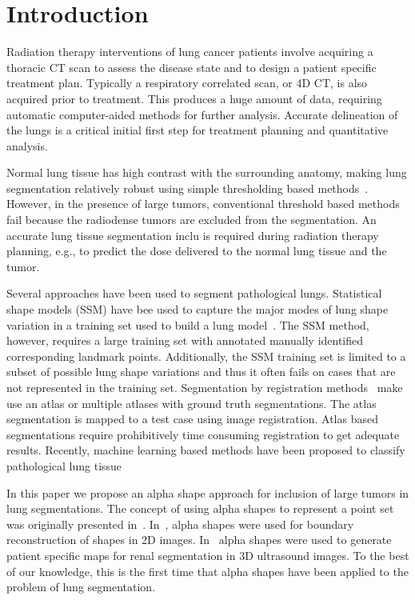 \documentclass{llncs}
\begin{document}
\section{Introduction}
%
Radiation therapy interventions of lung cancer patients involve acquiring a thoracic CT scan to assess the disease state and to design a patient specific treatment plan. Typically a respiratory correlated scan, or 4D CT, is also acquired prior to treatment. This produces a huge amount of data, requiring automatic computer-aided methods for further analysis. Accurate delineation of the lungs is a critical initial first step for treatment planning and quantitative analysis.

Normal lung tissue has high contrast with the surrounding anatomy, making lung segmentation relatively robust using simple thresholding based methods~\cite{guo2008,hu2001}. However, in the presence of large tumors, conventional threshold based methods fail because the radiodense tumors are excluded from the segmentation. An accurate lung tissue segmentation inclu is required during radiation therapy planning, e.g., to predict the dose delivered to the normal lung tissue and the tumor. 

Several approaches have been used to segment pathological lungs. Statistical shape models (SSM) have bee used to capture the major modes of lung shape variation in a training set used to build a lung model~\cite{sofka2011,sun2012}. The SSM method, however, requires a large training set with annotated manually identified corresponding landmark points. Additionally, the SSM training set is limited to a subset of possible lung shape variations and thus it often fails on cases that are not represented in the training set. Segmentation by registration methods~\cite{sluimer2005,vanrikxoort2009} make use an atlas or multiple atlases with ground truth segmentations. The atlas segmentation is mapped to a test case using image registration. Atlas based segmentations require prohibitively time consuming registration to get adequate results. Recently, machine learning based methods have been proposed to classify pathological lung tissue~\cite{mansoor2014,song2012}

In this paper we propose an alpha shape approach for inclusion of large tumors in lung segmentations. The concept of using alpha shapes to represent a point set was originally presented in~\cite{edelsbrunner1983}. In~\cite{stelldinger2006}, alpha shapes were used for boundary reconstruction of shapes in 2D images. In~\cite{cerrolaza2015} alpha shapes were used to generate patient specific maps for renal segmentation in 3D ultrasound images. To the best of our knowledge, this is the first time that alpha shapes have been applied to the problem of lung segmentation. 
\end{document}

